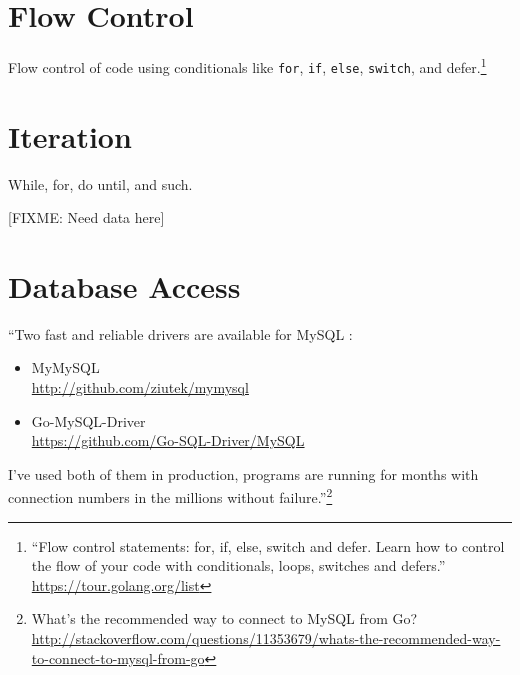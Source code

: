 \documentclass[12pt,letterpaper,dvips]{article}
\newcommand{\FIXME}[1]{\textsf{[FIXME: #1]}}
\begin{document}
\section{Flow Control}
Flow control of code using conditionals like \texttt{for},
\texttt{if}, \texttt{else}, \texttt{switch},
and defer.\footnote{``Flow control statements: for, if, else,
switch and defer.  Learn how to control the flow of your code
with conditionals, loops, switches and defers.''\\\href{https://tour.golang.org/list}{https://tour.golang.org/list}}


\section{Iteration}
While, for, do until, and such.

\noindent \FIXME{Need data here}


\newpage
\section{Database Access}
``Two fast and reliable drivers are available for MySQL :

\begin{itemize}
    \item MyMySQL\\
          \href{http://github.com/ziutek/mymysql}{http://github.com/ziutek/mymysql}
    \item Go-MySQL-Driver\\
      \href{https://github.com/Go-SQL-Driver/MySQL/}{https://github.com/Go-SQL-Driver/MySQL}
\end{itemize}

\noindent I've used both of them in production, programs are running for
months with connection numbers in the millions without
failure.''\footnote{What's the recommended way to connect to MySQL from Go?\\
  \href{http://stackoverflow.com/questions/11353679/whats-the-recommended-way-to-connect-to-mysql-from-go}{http://stackoverflow.com/questions/11353679/whats-the-recommended-way-to-connect-to-mysql-from-go}}
\end{document}
